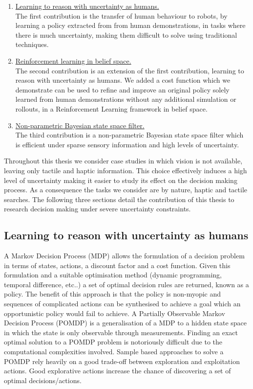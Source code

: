 \begin{enumerate}
 \item[\ref{sub:contr1}] \hyperref[sub:contr1]{Learning to reason with uncertainty as humans.}\\
 The first contribution is the transfer of human behaviour to robots, by learning a policy extracted from 
 from human demonstrations, in tasks where there is much uncertainty, making them difficult to solve using traditional techniques.
 \item[\ref{sub:contr2}] \hyperref[sub:contr2]{Reinforcement learning in belief space.}\\
 The second contribution is an extension of the first contribution, learning to reason with uncertainty as humans.
 We added a cost function which we demonstrate can be used to refine and improve an original policy solely learned from human demonstrations
 without any additional simulation or rollouts, in a Reinforcement Learning framework in belief space. 
 \item[\ref{sub:contr3}] \hyperref[sub:contr3]{Non-parametric Bayesian state space filter.}\\
 The third contribution is a non-parametric Bayesian state space filter which is efficient under sparse sensory information 
and high levels of uncertainty.
\end{enumerate}

Throughout this thesis we consider case studies in which vision is not available, leaving only tactile and 
haptic information. This choice effectively induces a high level of uncertainty making it easier to study its effect 
on the decision making process. As a consequence the tasks we consider are by nature, haptic and tactile searches.
The following three sections detail the contribution of this thesis to research decision making under severe 
uncertainty constraints.

\subsection{Learning to reason with uncertainty as humans}\label{sub:contr1}

A Markov Decision Process (MDP) allows the formulation of a decision problem in terms of states, actions, a discount factor 
and a cost function. Given this formulation and a suitable optimisation method (dynamic programming, temporal difference, etc..) 
a set of optimal decision rules are returned, known as a policy. The benefit of this approach 
is that the policy is non-myopic and sequences of complicated actions can be synthesised to achieve a goal which 
an opportunistic policy would fail to achieve. A Partially Observable Markov Decision Process (POMDP) is 
a generalisation of a MDP to a hidden state space in which the state is only observable 
through measurements. Finding an exact optimal solution to a POMDP problem is notoriously difficult due to 
the computational complexities involved. Sample based approaches to solve a POMDP rely heavily on 
a good trade-off between exploration and exploitation actions. Good explorative actions increase the chance of discovering 
a set of optimal decisions/actions.

